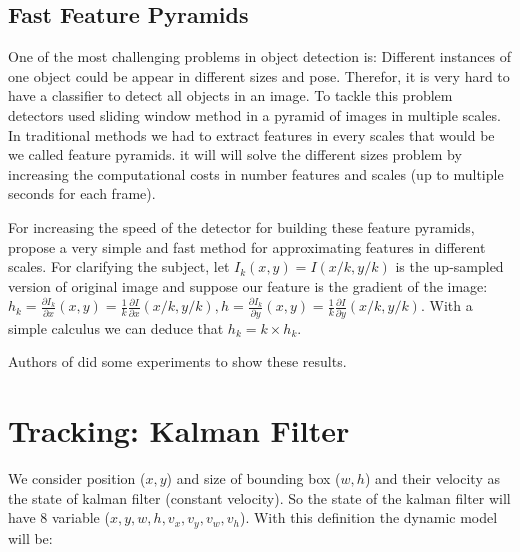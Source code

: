 \documentclass[conference]{IEEEtran}
\begin{document}
\subsection{Fast Feature Pyramids}
One of the most challenging problems in object detection is: Different instances of one object could be appear in different sizes and pose. Therefor, it is very hard to have a classifier to detect all objects in an image. To tackle this problem detectors used sliding window method in a pyramid of images in multiple scales. In traditional methods we had to extract features in every scales that would be we called feature pyramids. it will will solve the different sizes problem by increasing the computational costs in number features and scales (up to multiple seconds for each frame).

For increasing the speed of the detector for building these feature pyramids, \cite{dollar2014fast} propose a very simple and fast method for approximating features in different scales. For clarifying the subject, let $I_{k}(x,y)=I(x/k,y/k)$ is the up-sampled version of original image and suppose our feature is the gradient of the image: $ h_k = \frac{\partial I_k}{\partial x}(x,y)=\frac{1}{k}\frac{\partial I}{\partial x}(x/k,y/k), h = \frac{\partial I_k}{\partial y}(x,y)=\frac{1}{k}\frac{\partial I}{\partial y}(x/k,y/k)$. With a simple calculus we can deduce that $h_k=k\times h_k$.

Authors of \cite{dollar2014fast} did some experiments to show these results. 

\section{Tracking: Kalman Filter}

We consider position ($x,y$) and size of bounding box ($w,h$) and their velocity as the state of kalman filter (constant velocity). So the state of the kalman filter will have 8 variable ($x,y,w,h,v_x,v_y,v_w,v_h$).
With this definition the dynamic model will be:
\end{document}
